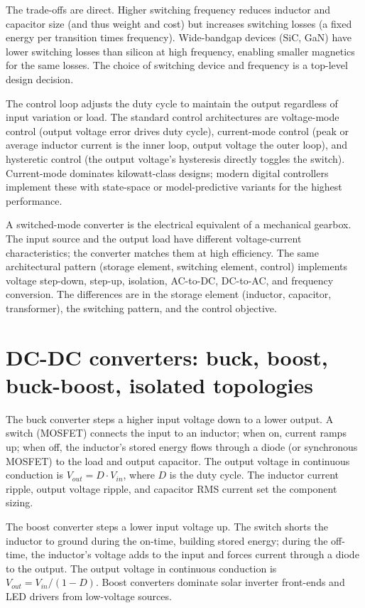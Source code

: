 The trade-offs are direct. Higher switching frequency reduces inductor and capacitor size (and thus weight and cost) but increases switching losses (a fixed energy per transition times frequency). Wide-bandgap devices (SiC, GaN) have lower switching losses than silicon at high frequency, enabling smaller magnetics for the same losses. The choice of switching device and frequency is a top-level design decision.

The control loop adjusts the duty cycle to maintain the output regardless of input variation or load. The standard control architectures are voltage-mode control (output voltage error drives duty cycle), current-mode control (peak or average inductor current is the inner loop, output voltage the outer loop), and hysteretic control (the output voltage's hysteresis directly toggles the switch). Current-mode dominates kilowatt-class designs; modern digital controllers implement these with state-space or model-predictive variants for the highest performance.

\begin{archetype}
A switched-mode converter is the electrical equivalent of a mechanical gearbox. The input source and the output load have different voltage-current characteristics; the converter matches them at high efficiency. The same architectural pattern (storage element, switching element, control) implements voltage step-down, step-up, isolation, AC-to-DC, DC-to-AC, and frequency conversion. The differences are in the storage element (inductor, capacitor, transformer), the switching pattern, and the control objective.
\end{archetype}

\section{DC-DC converters: buck, boost, buck-boost, isolated topologies}

The buck converter steps a higher input voltage down to a lower output. A switch (MOSFET) connects the input to an inductor; when on, current ramps up; when off, the inductor's stored energy flows through a diode (or synchronous MOSFET) to the load and output capacitor. The output voltage in continuous conduction is $V_{out} = D \cdot V_{in}$, where $D$ is the duty cycle. The inductor current ripple, output voltage ripple, and capacitor RMS current set the component sizing.

The boost converter steps a lower input voltage up. The switch shorts the inductor to ground during the on-time, building stored energy; during the off-time, the inductor's voltage adds to the input and forces current through a diode to the output. The output voltage in continuous conduction is $V_{out} = V_{in}/(1-D)$. Boost converters dominate solar inverter front-ends and LED drivers from low-voltage sources.


